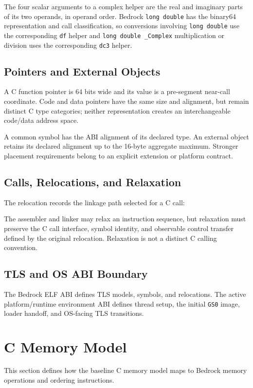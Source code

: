 \documentclass[10pt,twoside]{article}
\begin{document}
The four scalar arguments to a complex helper are the real and imaginary parts
of its two operands, in operand order. Bedrock \texttt{long double} has the
binary64 representation and call classification, so conversions involving
\texttt{long double} use the corresponding \texttt{df} helper and
\texttt{long double \_Complex} multiplication or division uses the
corresponding \texttt{dc3} helper.

\subsection{Pointers and External Objects}
A C function pointer is 64 bits wide and its value is a pre-segment near-call
coordinate. Code and data pointers have the
same size and alignment, but remain distinct C type categories; neither
representation creates an interchangeable code/data address space.

A common symbol has the ABI alignment of its declared type. An external
object retains its declared alignment up to the 16-byte aggregate maximum.
Stronger placement requirements belong to an explicit extension or platform
contract.

\subsection{Calls, Relocations, and Relaxation}
The relocation records the linkage path selected for a C call:



The assembler and linker may relax an instruction sequence, but relaxation
must preserve the C call interface, symbol identity, and observable control
transfer defined by the original relocation. Relaxation is not a distinct C
calling convention.

\subsection{TLS and OS ABI Boundary}
The Bedrock ELF ABI defines TLS models, symbols, and relocations. The active
platform/runtime environment ABI defines thread setup, the initial \texttt{GS0}
image, loader handoff, and OS-facing TLS transitions.

\section{C Memory Model}\label{page:c-memory-model}
This section defines how the baseline C memory model maps to Bedrock memory
operations and ordering instructions.
\end{document}

